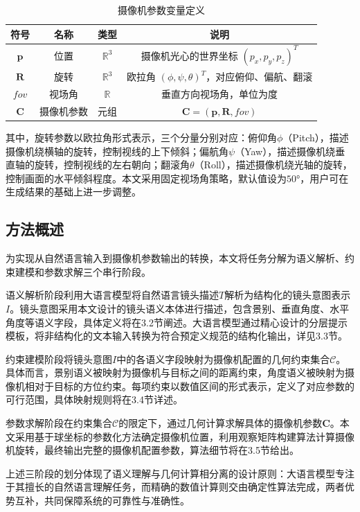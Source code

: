 \begin{table}[htbp]
\centering
\caption{摄像机参数变量定义}
\label{tab:output_definition}
\begin{tabular}{cccc}
\toprule
符号 & 名称 & 类型 & 说明 \\
\midrule
$\mathbf{p}$ & 位置 & $\mathbb{R}^3$ & 摄像机光心的世界坐标 $(p_x, p_y, p_z)^T$ \\
$\mathbf{R}$ & 旋转 & $\mathbb{R}^3$ & 欧拉角 $(\phi, \psi, \theta)^T$，对应俯仰、偏航、翻滚 \\
$\textit{fov}$ & 视场角 & $\mathbb{R}$ & 垂直方向视场角，单位为度 \\
$\mathbf{C}$ & 摄像机参数 & 元组 & $\mathbf{C} = (\mathbf{p}, \mathbf{R}, \textit{fov})$ \\
\bottomrule
\end{tabular}
\end{table}

其中，旋转参数以欧拉角形式表示，三个分量分别对应：俯仰角$\phi$（Pitch），描述摄像机绕横轴的旋转，控制视线的上下倾斜；偏航角$\psi$（Yaw），描述摄像机绕垂直轴的旋转，控制视线的左右朝向；翻滚角$\theta$（Roll），描述摄像机绕光轴的旋转，控制画面的水平倾斜程度。本文采用固定视场角策略，默认值设为$50°$，用户可在生成结果的基础上进一步调整。

\subsection{方法概述}

为实现从自然语言输入到摄像机参数输出的转换，本文将任务分解为语义解析、约束建模和参数求解三个串行阶段。

语义解析阶段利用大语言模型将自然语言镜头描述$T$解析为结构化的镜头意图表示$I$。镜头意图采用本文设计的镜头语义本体进行描述，包含景别、垂直角度、水平角度等语义字段，具体定义将在3.2节阐述。大语言模型通过精心设计的分层提示模板，将非结构化的文本输入转换为符合预定义规范的结构化输出，详见3.3节。

约束建模阶段将镜头意图$I$中的各语义字段映射为摄像机配置的几何约束集合$\mathcal{C}$。具体而言，景别语义被映射为摄像机与目标之间的距离约束，角度语义被映射为摄像机相对于目标的方位约束。每项约束以数值区间的形式表示，定义了对应参数的可行范围，具体映射规则将在3.4节详述。

参数求解阶段在约束集合$\mathcal{C}$的限定下，通过几何计算求解具体的摄像机参数$\mathbf{C}$。本文采用基于球坐标的参数化方法确定摄像机位置，利用观察矩阵构建算法计算摄像机旋转，最终输出完整的摄像机配置参数，算法细节将在3.5节给出。

上述三阶段的划分体现了语义理解与几何计算相分离的设计原则：大语言模型专注于其擅长的自然语言理解任务，而精确的数值计算则交由确定性算法完成，两者优势互补，共同保障系统的可靠性与准确性。

